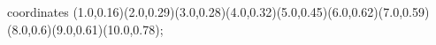 					coordinates { (1.0,0.16)(2.0,0.29)(3.0,0.28)(4.0,0.32)(5.0,0.45)(6.0,0.62)(7.0,0.59)(8.0,0.6)(9.0,0.61)(10.0,0.78)};